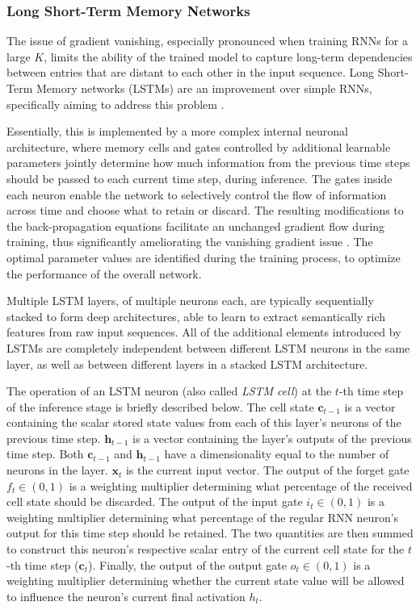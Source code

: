 \documentclass[preprint,review,12pt]{elsarticle}
\begin{document}
\subsubsection{Long Short-Term Memory Networks}
The issue of gradient vanishing, especially pronounced when training RNNs for a large $K$, limits the ability of the trained model to capture long-term dependencies between entries that are distant to each other in the input sequence. Long Short-Term Memory networks (LSTMs) are an improvement over simple RNNs, specifically aiming to address this problem \cite{sepp}.

Essentially, this is implemented by a more complex internal neuronal architecture, where memory cells and gates controlled by additional learnable parameters jointly determine how much information from the previous time steps should be passed to each current time step, during inference. The gates inside each neuron enable the network to selectively control the flow of information across time and choose what to retain or discard. The resulting modifications to the back-propagation equations facilitate an unchanged gradient flow during training, thus significantly ameliorating the vanishing gradient issue \cite{calin}. The optimal parameter values are identified during the training process, to optimize the performance of the overall network.

Multiple LSTM layers, of multiple neurons each, are typically sequentially stacked to form deep architectures, able to learn to extract semantically rich features from raw input sequences. All of the additional elements introduced by LSTMs are completely independent between different LSTM neurons in the same layer, as well as between different layers in a stacked LSTM architecture.

The operation of an LSTM neuron (also called \textit{LSTM cell}) at the $t$-th time step of the inference stage is briefly described below. The cell state $\mathbf{c}_{t-1}$ is a vector containing the scalar stored state values from each of this layer's neurons of the previous time step. $\mathbf{h}_{t-1}$ is a vector containing the layer's outputs of the previous time step. Both $\mathbf{c}_{t-1}$ and $\mathbf{h}_{t-1}$ have a dimensionality equal to the number of neurons in the layer. $\mathbf{x}_{t}$ is the current input vector. The output of the forget gate $f_t \in (0, 1)$ is a weighting multiplier determining what percentage of the received cell state should be discarded. The output of the input gate $i_t \in (0, 1)$ is a weighting multiplier determining what percentage of the regular RNN neuron's output for this time step should be retained. The two quantities are then summed to construct this neuron's respective scalar entry of the current cell state for the $t$-th time step ($\mathbf{c}_{t}$). Finally, the output of the output gate $o_t \in (0, 1)$ is a weighting multiplier determining whether the current state value will be allowed to influence the neuron's current final activation $h_t$.
\end{document}
